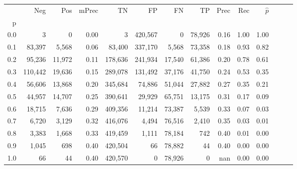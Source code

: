 \begin{tabular}{rrrrrrrrrrrrrr}
\toprule
{} &      Neg &     Pos & mPrec &       TN &       FP &      FN &      TP &  Prec &   Rec & $\hat{p}$ \\
p   &          &         &       &          &          &         &         &       &       &           \\
\midrule
0.0 &        3 &       0 &  0.00 &        3 &  420,567 &       0 &  78,926 &  0.16 &  1.00 &      1.00 \\
0.1 &   83,397 &   5,568 &  0.06 &   83,400 &  337,170 &   5,568 &  73,358 &  0.18 &  0.93 &      0.82 \\
0.2 &   95,236 &  11,972 &  0.11 &  178,636 &  241,934 &  17,540 &  61,386 &  0.20 &  0.78 &      0.61 \\
0.3 &  110,442 &  19,636 &  0.15 &  289,078 &  131,492 &  37,176 &  41,750 &  0.24 &  0.53 &      0.35 \\
0.4 &   56,606 &  13,868 &  0.20 &  345,684 &   74,886 &  51,044 &  27,882 &  0.27 &  0.35 &      0.21 \\
0.5 &   44,957 &  14,707 &  0.25 &  390,641 &   29,929 &  65,751 &  13,175 &  0.31 &  0.17 &      0.09 \\
0.6 &   18,715 &   7,636 &  0.29 &  409,356 &   11,214 &  73,387 &   5,539 &  0.33 &  0.07 &      0.03 \\
0.7 &    6,720 &   3,129 &  0.32 &  416,076 &    4,494 &  76,516 &   2,410 &  0.35 &  0.03 &      0.01 \\
0.8 &    3,383 &   1,668 &  0.33 &  419,459 &    1,111 &  78,184 &     742 &  0.40 &  0.01 &      0.00 \\
0.9 &    1,045 &     698 &  0.40 &  420,504 &       66 &  78,882 &      44 &  0.40 &  0.00 &      0.00 \\
1.0 &       66 &      44 &  0.40 &  420,570 &        0 &  78,926 &       0 &   nan &  0.00 &      0.00 \\
\bottomrule
\end{tabular}
